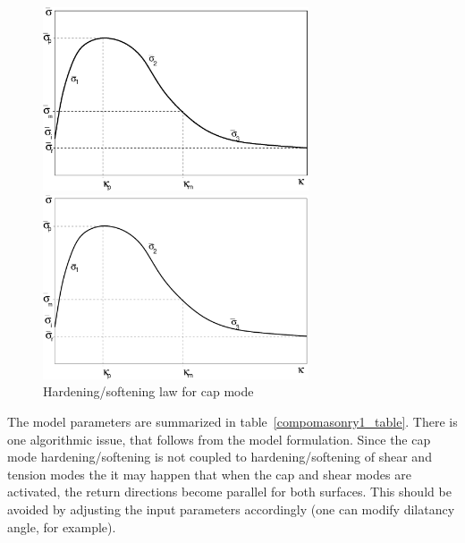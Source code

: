 \documentclass[a4paper]{article}
\begin{document}
\begin{figure}[!htb]
\begin{htmlonly}
  \centerline{\includegraphics[width=0.7\textwidth]{capmode.eps}}
\end{htmlonly}
\centerline{\includegraphics[width=0.7\textwidth]{capmode}}
\caption{Hardening/softening law for cap mode}
\label{hs3fig}
\end{figure}

The model parameters are summarized in table~\ref{compomasonry1_table}.
There is one algorithmic issue, that follows from the model
formulation. Since the cap mode hardening/softening is not coupled to
hardening/softening of shear and tension modes the it may happen that
when the cap and shear modes are activated, the return directions
become parallel for both surfaces. This should be avoided by adjusting
the input parameters accordingly (one can modify dilatancy angle, for example).
\end{document}
